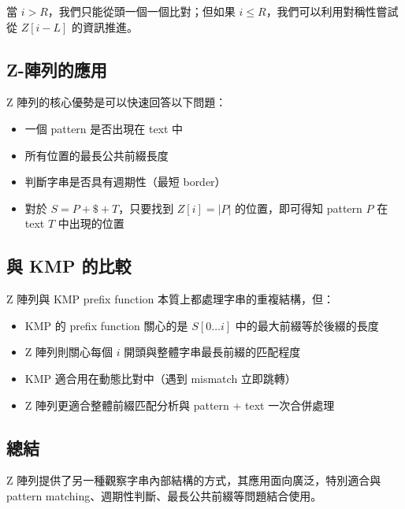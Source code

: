 當 $i > R$，我們只能從頭一個一個比對；但如果 $i \le R$，我們可以利用對稱性嘗試從 $Z[i - L]$ 的資訊推進。


\subsection{Z-陣列的應用}

Z 陣列的核心優勢是可以快速回答以下問題：

\begin{itemize}
    \item 一個 pattern 是否出現在 text 中
    \item 所有位置的最長公共前綴長度
    \item 判斷字串是否具有週期性（最短 border）
    \item 對於 $S = P + \texttt{\$} + T$，只要找到 $Z[i] = |P|$ 的位置，即可得知 pattern $P$ 在 text $T$ 中出現的位置
\end{itemize}

\subsection{與 KMP 的比較}

Z 陣列與 KMP prefix function 本質上都處理字串的重複結構，但：

\begin{itemize}
    \item KMP 的 prefix function 關心的是 $S[0 \ldots i]$ 中的最大前綴等於後綴的長度
    \item Z 陣列則關心每個 $i$ 開頭與整體字串最長前綴的匹配程度
    \item KMP 適合用在動態比對中（遇到 mismatch 立即跳轉）
    \item Z 陣列更適合整體前綴匹配分析與 pattern + text 一次合併處理
\end{itemize}

\subsection{總結}

Z 陣列提供了另一種觀察字串內部結構的方式，其應用面向廣泛，特別適合與 pattern matching、週期性判斷、最長公共前綴等問題結合使用。
